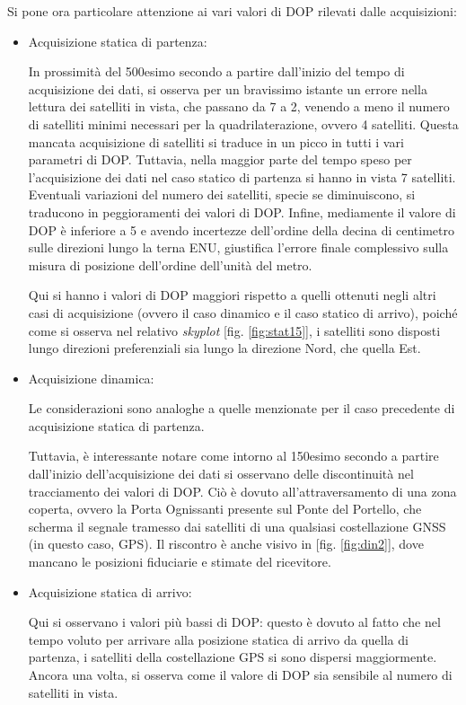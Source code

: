 \documentclass[a4paper,11pt,twoside]{book}
\begin{document}
	Si pone ora particolare attenzione ai vari valori di DOP rilevati dalle acquisizioni:
	
	\begin{itemize}[-]
		\item Acquisizione statica di partenza:
		
		In prossimità del 500esimo secondo a partire dall'inizio del tempo di acquisizione dei dati, si osserva per un bravissimo istante un errore nella lettura dei satelliti in vista, che passano da 7 a 2, venendo a meno il numero di satelliti minimi necessari per la quadrilaterazione, ovvero 4 satelliti. Questa mancata acquisizione di satelliti si traduce in un picco in tutti i vari parametri di DOP. Tuttavia, nella maggior parte del tempo speso per l'acquisizione dei dati nel caso statico di partenza si hanno in vista 7 satelliti. Eventuali variazioni del numero dei satelliti, specie se diminuiscono, si traducono in peggioramenti dei valori di DOP. Infine, mediamente il valore di DOP è inferiore a 5 e avendo incertezze dell'ordine della decina di centimetro sulle direzioni lungo la terna ENU, giustifica l'errore finale complessivo sulla misura di posizione dell'ordine dell'unità del metro.
		
		Qui si hanno i valori di DOP maggiori rispetto a quelli ottenuti negli altri casi di acquisizione (ovvero il caso dinamico e il caso statico di arrivo), poiché come si osserva nel relativo \textit{skyplot} [fig. \ref{fig:stat15}], i satelliti sono disposti lungo direzioni preferenziali sia lungo la direzione Nord, che quella Est.
		
		\item Acquisizione dinamica:
		
		Le considerazioni sono analoghe a quelle menzionate per il caso precedente di acquisizione statica di partenza. 
		
		Tuttavia, è interessante notare come intorno al 150esimo secondo a partire dall'inizio dell'acquisizione dei dati si osservano delle discontinuità nel tracciamento dei valori di DOP. Ciò è dovuto all'attraversamento di una zona coperta, ovvero la Porta Ognissanti presente sul Ponte del Portello, che scherma il segnale tramesso dai satelliti di una qualsiasi costellazione GNSS (in questo caso, GPS). Il riscontro è anche visivo in [fig. \ref{fig:din2}], dove mancano le posizioni fiduciarie e stimate del ricevitore.
		
		\item Acquisizione statica di arrivo:
		
		Qui si osservano i valori più bassi di DOP: questo è dovuto al fatto che nel tempo voluto per arrivare alla posizione statica di arrivo da quella di partenza, i satelliti della costellazione GPS si sono dispersi maggiormente. Ancora una volta, si osserva come il valore di DOP sia sensibile al numero di satelliti in vista. 
	\end{itemize}
\end{document}
